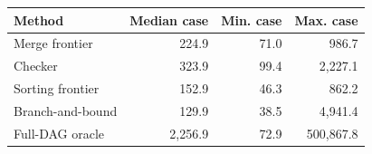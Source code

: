 \begin{tabular}{lrrr}
\toprule
Method & Median case & Min. case & Max. case\\\midrule
Merge frontier & 224.9 & 71.0 & 986.7\\
Checker & 323.9 & 99.4 & 2,227.1\\
Sorting frontier & 152.9 & 46.3 & 862.2\\
Branch-and-bound & 129.9 & 38.5 & 4,941.4\\
Full-DAG oracle & 2,256.9 & 72.9 & 500,867.8\\
\bottomrule
\end{tabular}
